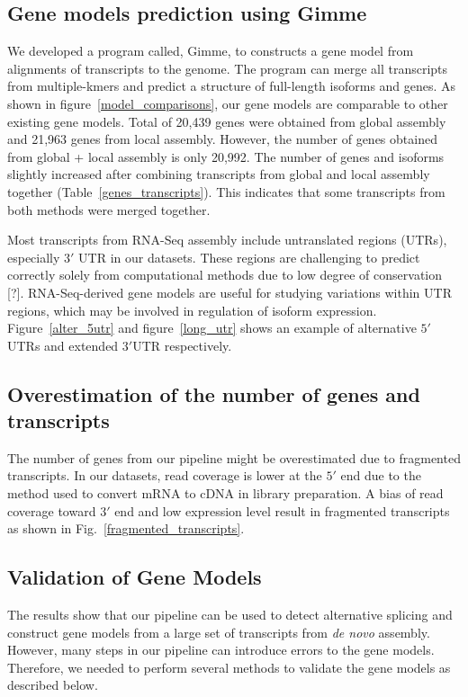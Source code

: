 \documentclass[10pt]{article}
\begin{document}
\subsection*{Gene models prediction using Gimme}

We developed a program called, Gimme, to constructs a gene model from alignments of transcripts to the genome.
The program can merge all transcripts from multiple-kmers and predict a structure of full-length isoforms and genes.
As shown in figure~\ref{model_comparisons}, our gene models are comparable to other existing gene models.
Total of 20,439 genes were obtained from global assembly and 21,963 genes from local assembly.
However, the number of genes obtained from global + local assembly is only 20,992.
The number of genes and isoforms slightly increased after combining transcripts from global and local
assembly together (Table~\ref{genes_transcripts}). 
This indicates that some transcripts from both methods were merged together.

Most transcripts from RNA-Seq assembly include untranslated regions (UTRs), especially $3'$ UTR in our datasets.
These regions are challenging to predict correctly solely from computational methods due to low degree of conservation [?].
RNA-Seq-derived gene models are useful for studying variations within UTR regions, which may be involved in regulation of isoform expression\cite{}.
Figure~\ref{alter_5utr} and figure~\ref{long_utr} shows an example of alternative $5'$UTRs and extended $3'$UTR respectively.

\subsection*{Overestimation of the number of genes and transcripts}
The number of genes from our pipeline might be overestimated due to fragmented transcripts.
In our datasets, read coverage is lower at the $5'$ end due to the method used to convert mRNA to cDNA
in library preparation.
A bias of read coverage toward $3'$ end and low expression level result in fragmented transcripts as shown in Fig.~\ref{fragmented_transcripts}.

\subsection*{Validation of Gene Models}

The results show that our pipeline can be used to detect alternative splicing and construct gene models from a large set of transcripts from \emph{de novo} assembly.
However, many steps in our pipeline can introduce errors to the gene models.
Therefore, we needed to perform several methods to validate the gene models as described below.
\end{document}
